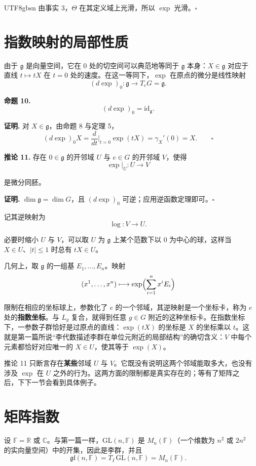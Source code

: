 \documentclass[11pt]{article}
\begin{document}
\begin{CJK*}{UTF8}{gbsn}
由事实 3，$\Theta$ 在其定义域上光滑，所以 $\exp$ 光滑。$\square$

\section{指数映射的局部性质}

由于 $\mathfrak{g}$ 是向量空间，它在 $0$ 处的切空间可以典范地等同于 $\mathfrak{g}$ 本身：$X \in \mathfrak{g}$ 对应于直线 $t \mapsto tX$ 在 $t = 0$ 处的速度。在这一等同下，$\exp$ 在原点的微分是线性映射
\[
(d\exp)_0 : \mathfrak{g} \to T_eG = \mathfrak{g}.
\]

\textbf{命题 10.}
\[
\boxed{(d\exp)_0 = \mathrm{id}_{\mathfrak{g}}.}
\]

\textbf{证明.} 对 $X \in \mathfrak{g}$，由命题 8 与定理 5，
\[
(d\exp)_0 X = \frac{d}{dt}\Big|_{t=0} \exp(tX) = \gamma_X'(0) = X. \qquad \square
\]

\textbf{推论 11.} 存在 $0 \in \mathfrak{g}$ 的开邻域 $U$ 与 $e \in G$ 的开邻域 $V$，使得
\[
\exp|_U : U \to V
\]

是微分同胚。

\textbf{证明.} $\dim \mathfrak{g} = \dim G$，且 $(d\exp)_0$ 可逆；应用逆函数定理即可。$\square$

记其逆映射为
\[
\log : V \to U.
\]

必要时缩小 $U$ 与 $V$，可以取 $U$ 为 $\mathfrak{g}$ 上某个范数下以 $0$ 为中心的球，这样当 $X \in U$、$|t| \le 1$ 时总有 $tX \in U$。

几何上，取 $\mathfrak{g}$ 的一组基 $E_1, \dots, E_n$。映射
\[
(x^1, \dots, x^n) \longmapsto \exp\Bigl(\sum_{i=1}^n x^i E_i\Bigr)
\]

限制在相应的坐标球上，参数化了 $e$ 的一个邻域，其逆映射是一个坐标卡，称为 $e$ 处的\textbf{指数坐标}。与 $L_g$ 复合，就得到任意 $g \in G$ 附近的这种坐标卡。在指数坐标下，一参数子群恰好是过原点的直线：$\exp(tX)$ 的坐标是 $X$ 的坐标乘以 $t$。这就是第一篇所说“李代数描述李群在单位元附近的局部结构”的确切含义：$V$ 中每个元素都恰好对应唯一的 $X \in U$，使其等于 $\exp(X)$。

推论 11 只断言存在\textbf{某些}邻域 $U$ 与 $V$。它既没有说明这两个邻域能取多大，也没有涉及 $\exp$ 在 $U$ 之外的行为。这两方面的限制都是真实存在的；等有了矩阵之后，下下一节会看到具体例子。

\section{矩阵指数}

设 $\mathbb{F} = \mathbb{R}$ 或 $\mathbb{C}$。与第一篇一样，$\mathrm{GL}(n, \mathbb{F})$ 是 $M_n(\mathbb{F})$（一个维数为 $n^2$ 或 $2n^2$ 的实向量空间）中的开集，因此是李群，并且
\[
\mathfrak{gl}(n, \mathbb{F}) = T_I\,\mathrm{GL}(n, \mathbb{F}) = M_n(\mathbb{F}).
\]


\end{CJK*}
\end{document}
